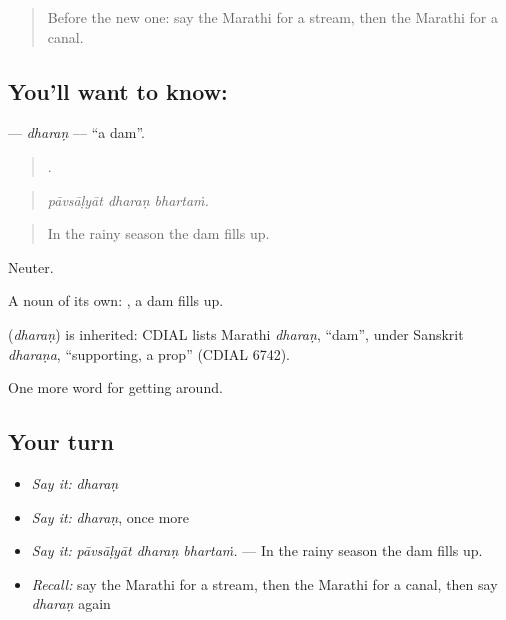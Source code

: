 \label{lesson:MR-C443-dharan}



\begin{quote}
Before the new one: say the Marathi for a stream, then the Marathi for a canal.
\end{quote}

\subsection*{You'll want to know: }
\textbf{} — \emph{dharaṇ} — \textquotedblleft{}a dam\textquotedblright{}.

\begin{quote}
  .
\end{quote}

\begin{quote}
\emph{pāvsāḷyāt dharaṇ bhartaṁ.}
\end{quote}

\begin{quote}
In the rainy season the dam fills up.
\end{quote}

Neuter.

A noun of its own:  , a dam fills up.

\begin{cousinweb}
\textbf{} (\emph{dharaṇ}) is inherited: CDIAL lists Marathi \emph{dharaṇ}, \textquotedblleft{}dam\textquotedblright{}, under Sanskrit \emph{dharaṇa}, \textquotedblleft{}supporting, a prop\textquotedblright{} (CDIAL 6742).
\end{cousinweb}

\begin{grammarlens}[title={What you've built}]
One more word for getting around.
\end{grammarlens}

\subsection*{Your turn}
\begin{itemize}
\raggedright
  \item \emph{Say it:} \emph{dharaṇ}
  \item \emph{Say it:} \emph{dharaṇ}, once more
  \item \emph{Say it:} \emph{pāvsāḷyāt dharaṇ bhartaṁ.} — In the rainy season the dam fills up.
  \item \emph{Recall:} say the Marathi for a stream, then the Marathi for a canal, then say \emph{dharaṇ} again
\end{itemize}

